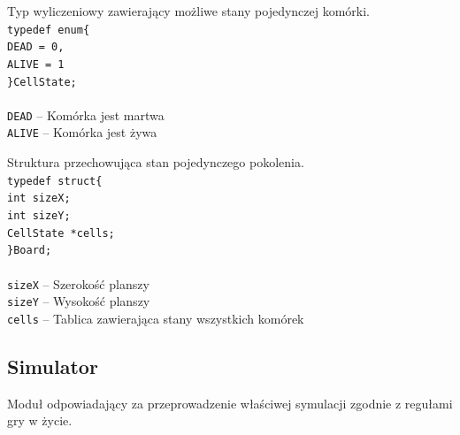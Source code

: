 \documentclass{article}
\begin{document}
Typ wyliczeniowy zawierający możliwe stany pojedynczej komórki. \\
\texttt{typedef enum\{\\
	 \hspace*{10mm}DEAD = 0,\\
	 \hspace*{10mm}ALIVE = 1\\
\}CellState;\\} \\
\texttt{DEAD} -- Komórka jest martwa \\
\texttt{ALIVE} -- Komórka jest żywa

\vspace*{10mm}

\noindent{}Struktura przechowująca stan pojedynczego pokolenia. \\
\texttt{typedef struct\{\\
	 \hspace*{10mm}int sizeX;\\
	 \hspace*{10mm}int sizeY;\\
	 \hspace*{10mm}CellState *cells;\\
\}Board;\\} \\
\texttt{sizeX} -- Szerokość planszy \\
\texttt{sizeY} -- Wysokość planszy \\
\texttt{cells} -- Tablica zawierająca stany wszystkich komórek


\subsection{Simulator}
Moduł odpowiadający za przeprowadzenie właściwej symulacji zgodnie z regułami gry w życie.
\end{document}
